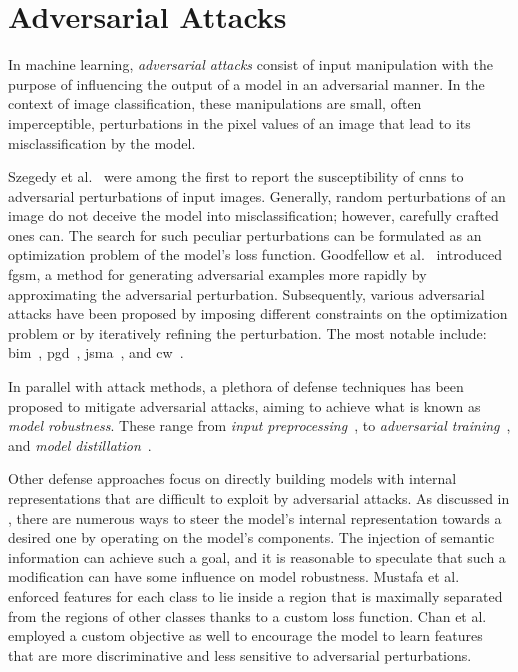 \section{Adversarial Attacks}
\label{sec:adversarial-attacks-related-work}

In machine learning, \emph{adversarial attacks} consist of input manipulation with the purpose of influencing the output of a model in an adversarial manner.
In the context of image classification, these manipulations are small, often imperceptible, perturbations in the pixel values of an image that lead to its misclassification by the model.

Szegedy et al.~\cite{IntriguingPropSzeged2013} were among the first to report the susceptibility of \acrshort{cnn}s to adversarial perturbations of input images. Generally, random perturbations of an image do not deceive the model into misclassification; however, carefully crafted ones can. The search for such peculiar perturbations can be formulated as an optimization problem of the model's loss function.
Goodfellow et al.~\cite{ExplainingAndGoodfe2014} introduced \acrfull{fgsm}, a method for generating adversarial examples more rapidly by approximating the adversarial perturbation.
Subsequently, various adversarial attacks have been proposed by imposing different constraints on the optimization problem or by iteratively refining the perturbation. The most notable include: \acrfull{bim}~\cite{AdversarialExaKuraki2016}, \acrfull{pgd}~\cite{TowardsDeepLeMadry2017}, \acrfull{jsma}~\cite{MaximalJacobiaWiyatn2018}, and \acrfull{cw}~\cite{TowardsEvaluatCarlin2016}.

In parallel with attack methods, a plethora of defense techniques has been proposed to mitigate adversarial attacks, aiming to achieve what is known as \emph{model robustness}. These range from \emph{input preprocessing}~\cite{FeatureSqueeziXuWe2017, CounteringAdveGuoC2017, AStudyOfTheDziuga2016, DefenseAgainstLiao2017}, to \emph{adversarial training}~\cite{ExplainingAndGoodfe2014, TowardsDeepLeMadry2017, EnsembleAdversTramer2017, AdversarialMacKuraki2016}, and \emph{model distillation}~\cite{DistillationAsPapern2015, TheLimitationsPapern2015, DefensiveDistiCarlin2016, AdversariallyRGoldbl2019}.

Other defense approaches focus on directly building models with internal representations that are difficult to exploit by adversarial attacks. As discussed in , there are numerous ways to steer the model's internal representation towards a desired one by operating on the model's components. The injection of semantic information can achieve such a goal, and it is reasonable to speculate that such a modification can have some influence on model robustness. Mustafa et al.~\cite{AdversarialDefMustaf2019} enforced features for each class to lie inside a region that is maximally separated from the regions of other classes thanks to a custom loss function. Chan et al.~\cite{ImprovingAdverChen2019} employed a custom objective as well to encourage the model to learn features that are more discriminative and less sensitive to adversarial perturbations.
